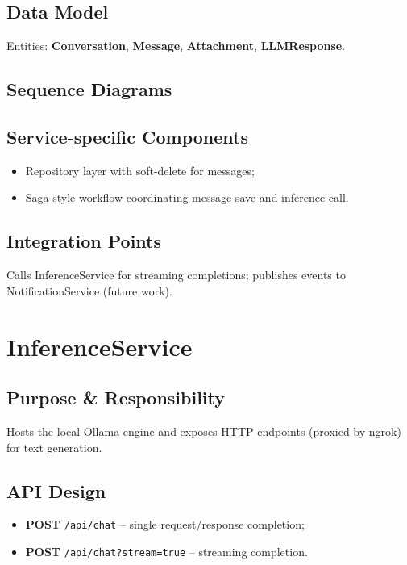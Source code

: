 \subsection{Data Model}
Entities: \textbf{Conversation}, \textbf{Message}, \textbf{Attachment}, \textbf{LLMResponse}.

\subsection{Sequence Diagrams}

\subsection{Service-specific Components}
\begin{itemize}
  \item Repository layer with soft-delete for messages;
  \item Saga-style workflow coordinating message save and inference call.
\end{itemize}

\subsection{Integration Points}
Calls InferenceService for streaming completions; publishes events to NotificationService (future work).

\section{InferenceService}
\subsection{Purpose \& Responsibility}
Hosts the local Ollama engine and exposes HTTP endpoints (proxied by ngrok) for text generation.

\subsection{API Design}
\begin{itemize}
  \item \textbf{POST} \texttt{/api/chat} – single request/response completion;
  \item \textbf{POST} \texttt{/api/chat?stream=true} – streaming completion.
\end{itemize}

